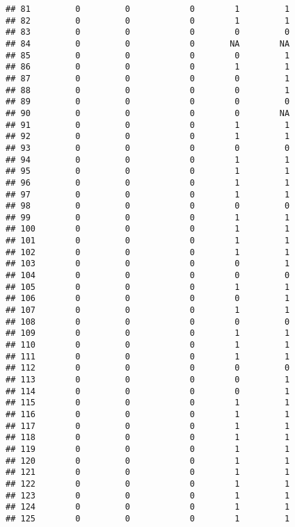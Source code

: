 \documentclass[
]{article}
\begin{document}
\begin{verbatim}
## 81         0         0            0        1         1
## 82         0         0            0        1         1
## 83         0         0            0        0         0
## 84         0         0            0       NA        NA
## 85         0         0            0        0         1
## 86         0         0            0        1         1
## 87         0         0            0        0         1
## 88         0         0            0        0         1
## 89         0         0            0        0         0
## 90         0         0            0        0        NA
## 91         0         0            0        1         1
## 92         0         0            0        1         1
## 93         0         0            0        0         0
## 94         0         0            0        1         1
## 95         0         0            0        1         1
## 96         0         0            0        1         1
## 97         0         0            0        1         1
## 98         0         0            0        0         0
## 99         0         0            0        1         1
## 100        0         0            0        1         1
## 101        0         0            0        1         1
## 102        0         0            0        1         1
## 103        0         0            0        0         1
## 104        0         0            0        0         0
## 105        0         0            0        1         1
## 106        0         0            0        0         1
## 107        0         0            0        1         1
## 108        0         0            0        0         0
## 109        0         0            0        1         1
## 110        0         0            0        1         1
## 111        0         0            0        1         1
## 112        0         0            0        0         0
## 113        0         0            0        0         1
## 114        0         0            0        0         1
## 115        0         0            0        1         1
## 116        0         0            0        1         1
## 117        0         0            0        1         1
## 118        0         0            0        1         1
## 119        0         0            0        1         1
## 120        0         0            0        1         1
## 121        0         0            0        1         1
## 122        0         0            0        1         1
## 123        0         0            0        1         1
## 124        0         0            0        1         1
## 125        0         0            0        1         1

\end{verbatim}
\end{document}
